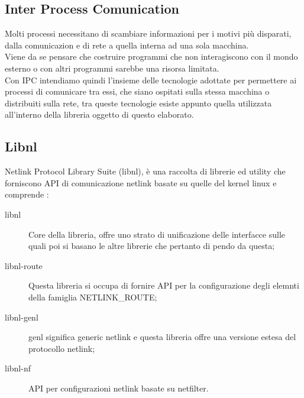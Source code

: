 \subsection{Inter Process Comunication}
Molti processi necessitano di scambiare informazioni per i motivi pi\`u disparati, dalla comunicazion e di rete a quella interna ad una sola macchina.\\
Viene da se pensare che costruire programmi che non interagiscono con il mondo esterno o con altri programmi sarebbe una risorsa limitata.\\
Con IPC intendiamo quindi l'insieme delle tecnologie adottate per permettere ai processi di comunicare tra essi, che siano ospitati sulla stessa macchina o distribuiti sulla rete, tra queste tecnologie esiste appunto quella utilizzata all'interno della libreria oggetto di questo elaborato.
\subsection{Libnl}
Netlink Protocol Library Suite (libnl), \`e una raccolta di librerie ed utility che forniscono API di comunicazione netlink basate su quelle del kernel linux e comprende \cite{K10}:
\begin{description}                     %
  \item[libnl] Core della libreria, offre uno strato di unificazione delle interfacce sulle quali poi si basano le altre librerie che pertanto di pendo da questa;
  \item[libnl-route] Questa libreria si occupa di fornire API per la configurazione degli elemnti della famiglia NETLINK\_ROUTE;
  \item[libnl-genl] genl significa generic netlink e questa libreria offre una versione estesa del protocollo netlink;
  \item[libnl-nf] API per configurazioni netlink basate su netfilter.

\end{description}

\clearpage{\pagestyle{empty}\cleardoublepage} 
